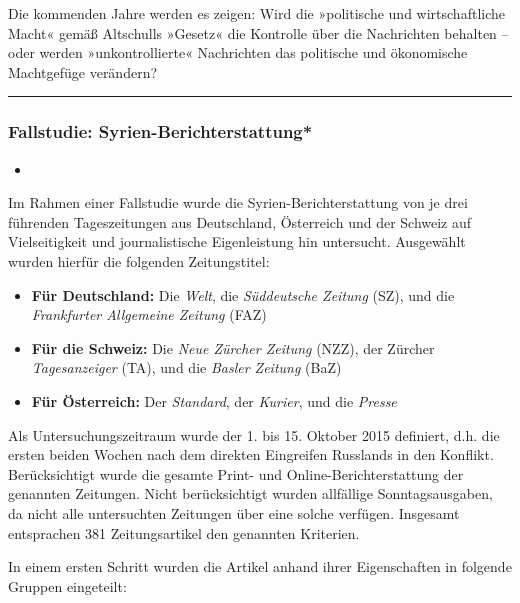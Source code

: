 Die kommenden Jahre werden es zeigen: Wird die »politische und
wirtschaftliche Macht« gemäß Altschulls »Gesetz« die Kontrolle über die
Nachrichten behalten -- oder werden »unkontrollierte« Nachrichten das
politische und ökonomische Machtgefüge verändern?

\begin{center}\rule{0.5\linewidth}{\linethickness}\end{center}

\hypertarget{fallstudie-syrien-berichterstattung}{%
\subsubsection{Fallstudie:
Syrien-Berichterstattung*}\label{fallstudie-syrien-berichterstattung}}

\begin{itemize}
\item
\end{itemize}

Im Rahmen einer Fallstudie wurde die Syrien-Berichterstattung von je
drei führenden Tageszeitungen aus Deutschland, Österreich und der
Schweiz auf Vielseitigkeit und journalistische Eigenleistung hin
untersucht. Ausgewählt wurden hierfür die folgenden Zeitungstitel:

\begin{itemize}
\tightlist
\item
  \textbf{Für Deutschland:} Die \emph{Welt}, die \emph{Süddeutsche
  Zeitung} (SZ), und die \emph{Frankfurter Allgemeine Zeitung} (FAZ)
\item
  \textbf{Für die Schweiz:} Die \emph{Neue Zürcher Zeitung} (NZZ), der
  Zürcher \emph{Tagesanzeiger} (TA), und die \emph{Basler Zeitung} (BaZ)
\item
  \textbf{Für Österreich:} Der \emph{Standard}, der \emph{Kurier}, und
  die \emph{Presse}
\end{itemize}

Als Untersuchungs­zeitraum wurde der 1. bis 15. Oktober 2015 definiert,
d.h. die ersten beiden Wochen nach dem direkten Eingreifen Russlands in
den Konflikt. Berücksichtigt wurde die gesamte Print- und
Online-Berichterstattung der genannten Zeitungen. Nicht berücksichtigt
wurden allfällige Sonntags­ausgaben, da nicht alle untersuchten
Zeitungen über eine solche verfügen. Insgesamt entsprachen 381
Zeitungs­artikel den genannten Kriterien.

In einem ersten Schritt wurden die Artikel anhand ihrer Eigenschaften in
folgende Gruppen eingeteilt:


